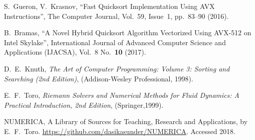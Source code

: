 \documentclass[
11pt,%
tightenlines,%
twoside,%
onecolumn,%
nofloats,%
nobibnotes,%
nofootinbib,%
superscriptaddress,%
noshowpacs,%
centertags]%
{revtex4}
\begin{document}
\begin{thebibliography}{99}
S.~Gueron, V.~Krasnov, \textquotedblleft Fast Quicksort Implementation Using AVX Instructions\textquotedblright, The Computer Journal, Vol.~59, Issue~1, pp.~83--90 (2016).

B.~Bramas, \textquotedblleft A Novel Hybrid Quicksort Algorithm Vectorized Using AVX-512 on Intel Skylake\textquotedblright, International Journal of Advanced Computer Science and Applications (IJACSA), Vol.~8 No.~\textbf{10} (2017).

D.~E.~Knuth, \emph{The Art of Computer Programming: Volume 3: Sorting and Searching (2nd Edition)}, (Addison-Wesley Professional, 1998).


E.~F.~Toro, \emph{Riemann Solvers and Numerical Methods for Fluid Dynamics:
A Practical Introduction, 2nd Edition}, (Springer,1999).

NUMERICA, A Library of Sources for Teaching, Research and Applications, by E.~F.~Toro. \url{https://github.com/dasikasunder/NUMERICA}. Accessed 2018.

\end{thebibliography}
\end{document}
